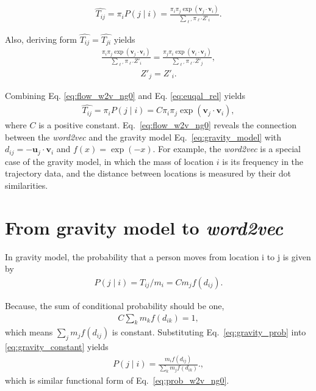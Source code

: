 \documentclass[12pt]{article} %
\def\given{\mid}
\begin{document}
\begin{align}
    \hat{T_{ij}}=\pi_i P(j\given i) =  \frac{\pi_i \pi _j  \exp(\bm{v}_j \cdot \bm{v}_{i})}{ \sum_{\ell'} \pi_{\ell'} Z'_i}. \label{eq:flow_w2v_ng0}
\end{align}

Also, deriving form $\hat{T_{ij}}=\hat{T_{ji}}$ yields
\begin{align}
    \frac{\pi_i \pi _j  \exp(\bm{v}_j \cdot \bm{v}_{i})}{ \sum_{\ell'} \pi_{\ell'} Z'_i} =  \frac{\pi_j \pi _i  \exp(\bm{v}_i \cdot \bm{v}_{j})}{ \sum_{\ell'} \pi_{\ell'} Z'_j},
\end{align}
\begin{align}
    Z'_j = Z'_i. \label{eq:euqal_rel}
\end{align}

Combining Eq. \eqref{eq:flow_w2v_ng0} and Eq. \eqref{eq:euqal_rel} yields
\begin{align}
\hat{T_{ij}}=\pi_i P(j\given i) =  C \pi_i \pi _j  \exp(\bm{v}_j \cdot \bm{v}_{i}),
\end{align}
where $C$ is a positive constant.
Eq.~\eqref{eq:flow_w2v_ng0} reveals the connection between the \textit{word2vec} and the gravity model Eq.~\eqref{eq:gravity_model} with $d_{ij} = - \bm{u}_{j} \cdot \bm{v}_{i}$ and $f(x) = \exp(-x)$.
For example, the \textit{word2vec} is a special case of the gravity model, in which the mass of location $i$ is its frequency in the trajectory data, and the distance between locations is measured by their dot similarities.

\section{From gravity model to \textit{word2vec}}
In gravity model,  the probability that a person moves from location i to j is given by
\begin{align}
P\left(j \given i \right) = T_{ij} / m_i = C m_j f(d_{ij}). \label{eq:gravity_prob}
\end{align}

Because, the sum of conditional probability should be one,
\begin{align}
 C \sum_{k} m_k f(d_{ik}) = 1, \label{eq:gravity_constant}
\end{align}
which means $\sum_{j} m_j f(d_{ij})$ is constant. Substituting Eq.~\eqref{eq:gravity_prob} into \eqref{eq:gravity_constant} yields
\begin{align}
P\left(j \given i \right) = \frac{m_i f(d_{ij})}{\sum_{k} m_j f(d_{ik})}. \label{eq:gravity_prob},
\end{align}
which is similar functional form of  Eq.~\eqref{eq:prob_w2v_ng0}.
\end{document}
